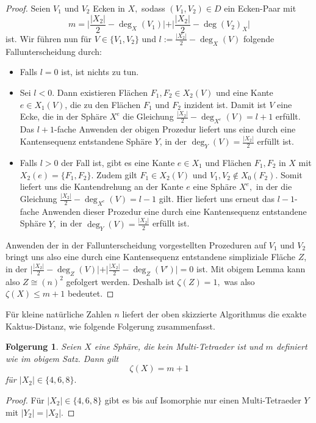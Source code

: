 \documentclass[12pt,titlepage,twoside,cleardoublepage]{article}
\theoremstyle{nummermitklammern}
\newtheorem{folgerung}[temp]{Folgerung}
\newtheorem{folgerung}[zahl]{Folgerung}
\numberwithin{equation}{section}
\begin{document}
\begin{proof}
Seien $V_1$ und $V_2$ Ecken in $X,$ sodass $(V_1,V_2)\in D$ ein Ecken-Paar mit 
\[
m=\vert\frac{\vert X_2 \vert}{2}-\deg_X(V_1)\vert +\vert \frac{\vert X_2 \vert}{2}-\deg(V_2)_X\vert
\]
 ist.
Wir führen nun für $V \in \{V_1,V_2\}$ und $l:=\frac{\vert X_2 \vert}{2}-\deg_X(V)$ folgende Fallunterscheidung durch:
\begin{itemize}
\item Falls $l=0$ ist, ist nichts zu tun.
\item Sei $l<0$. Dann existieren Flächen $F_1,F_2 \in X_2(V)$ und eine Kante $e\in X_1(V)$, die zu den Flächen $F_1$ und $F_2$ inzident ist. Damit ist $V$ eine Ecke, die in der Sphäre $X^e$ die Gleichung $\frac{\vert X_2\vert }{2}-\deg_{X^e}(V)=l+1$ erfüllt. Das $l+1$-fache Anwenden der obigen Prozedur liefert uns eine durch eine Kantensequenz entstandene Sphäre $Y$, in der $\deg_Y(V)=\frac{\vert X_2\vert }{2}$ erfüllt ist. 
 \item Falls $l>0$ der Fall ist, gibt es eine Kante $e\in X_1$ und Flächen $F_1,F_2$ in $X$ mit $X_2(e)=\{F_1,F_2\}$. Zudem gilt $F_1\in X_2(V)$ und $V_1,V_2 \notin X_0(F_2)$. Somit liefert uns die Kantendrehung an der Kante $e$ eine Sphäre $X^e,$ in der die  Gleichung $\frac{\vert X_2\vert }{2}-\deg_{X^e}(V)=l-1$ gilt. Hier liefert uns erneut das $l-1$-fache Anwenden dieser Prozedur eine durch eine Kantensequenz entstandene Sphäre $Y,$ in der $\deg_Y(V)=\frac{\vert X_2\vert }{2}$ erfüllt ist.
\end{itemize}  
 Anwenden der in der Fallunterscheidung vorgestellten Prozeduren auf $V_1$ und $V_2$ bringt uns also eine durch eine Kantensequenz entstandene simpliziale Fläche $Z$, in der $\vert\frac{\vert X_2 \vert}{2}-\deg_Z(V)\vert +\vert \frac{\vert X_2 \vert}{2}-\deg_Z(V')\vert=0$ ist. Mit obigem Lemma kann also $Z\cong (n)^2$ gefolgert werden. Deshalb ist $\zeta(Z)=1,$ was also $\zeta(X)\leq m+1$ bedeutet. 
\end{proof}

Für kleine natürliche Zahlen $n$ liefert der oben skizzierte Algorithmus die exakte Kaktus-Distanz, wie folgende Folgerung zusammenfasst. 
\begin{folgerung}
Seien $X$ eine Sphäre, die kein Multi-Tetraeder ist und $m$ definiert wie im obigem Satz. Dann gilt 
\[
\zeta(X)= m+1
\]
 für $\vert X_2 \vert \in \{4,6,8\}.$ 
\end{folgerung}
\begin{proof}
Für $\vert X_2 \vert \in \{4,6,8\}$ gibt es bis auf Isomorphie nur einen Multi-Tetraeder $Y$ mit $\vert Y_2\vert=\vert X_2\vert.$
\end{proof}
\end{document}

